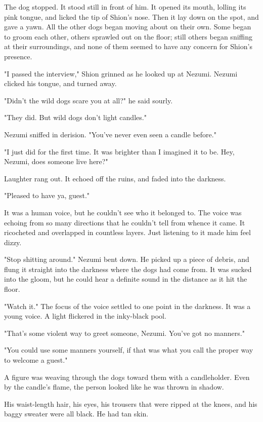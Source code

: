 The dog stopped. It stood still in front of him. It opened its mouth,
lolling its pink tongue, and licked the tip of Shion's nose. Then it lay
down on the spot, and gave a yawn. All the other dogs began moving about
on their own. Some began to groom each other, others sprawled out on the
floor; still others began sniffing at their surroundings, and none of
them seemed to have any concern for Shion's presence.

"I passed the interview," Shion grinned as he looked up at Nezumi.
Nezumi clicked his tongue, and turned away.

"Didn't the wild dogs scare you at all?" he said sourly.

"They did. But wild dogs don't light candles."

Nezumi sniffed in derision. "You've never even seen a candle before."

"I just did for the first time. It was brighter than I imagined it to
be. Hey, Nezumi, does someone live here?"

Laughter rang out. It echoed off the ruins, and faded into the darkness.

"Pleased to have ya, guest."

It was a human voice, but he couldn't see who it belonged to. The voice
was echoing from so many directions that he couldn't tell from whence it
came. It ricocheted and overlapped in countless layers. Just listening
to it made him feel dizzy.

"Stop shitting around." Nezumi bent down. He picked up a piece of
debris, and flung it straight into the darkness where the dogs had come
from. It was sucked into the gloom, but he could hear a definite sound
in the distance as it hit the floor.

"Watch it." The focus of the voice settled to one point in the darkness.
It was a young voice. A light flickered in the inky-black pool.

"That's some violent way to greet someone, Nezumi. You've got no
manners."

"You could use some manners yourself, if that was what you call the
proper way to welcome a guest."

A figure was weaving through the dogs toward them with a candleholder.
Even by the candle's flame, the person looked like he was thrown in
shadow.

His waist-length hair, his eyes, his trousers that were ripped at the
knees, and his baggy sweater were all black. He had tan skin.

